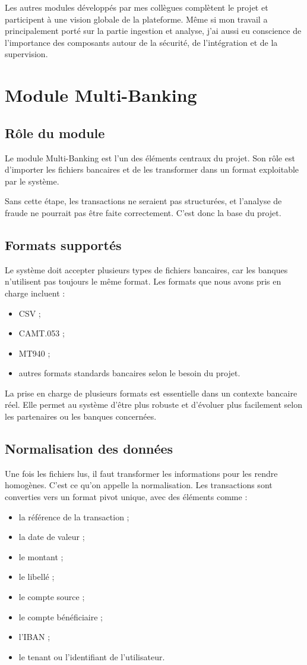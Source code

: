 ﻿\documentclass[12pt,a4paper]{report}
\begin{document}
Les autres modules développés par mes collègues complètent le projet et participent à une vision globale de la plateforme. Même si mon travail a principalement porté sur la partie ingestion et analyse, j'ai aussi eu conscience de l'importance des composants autour de la sécurité, de l'intégration et de la supervision.

\chapter{Module Multi-Banking}
\section{Rôle du module}
Le module Multi-Banking est l'un des éléments centraux du projet. Son rôle est d'importer les fichiers bancaires et de les transformer dans un format exploitable par le système.

Sans cette étape, les transactions ne seraient pas structurées, et l'analyse de fraude ne pourrait pas être faite correctement. C'est donc la base du projet.

\section{Formats supportés}
Le système doit accepter plusieurs types de fichiers bancaires, car les banques n'utilisent pas toujours le même format. Les formats que nous avons pris en charge incluent :
\begin{itemize}[leftmargin=1.5em]
    \item CSV ;
    \item CAMT.053 ;
    \item MT940 ;
    \item autres formats standards bancaires selon le besoin du projet.
\end{itemize}

La prise en charge de plusieurs formats est essentielle dans un contexte bancaire réel. Elle permet au système d'être plus robuste et d'évoluer plus facilement selon les partenaires ou les banques concernées.

\section{Normalisation des données}
Une fois les fichiers lus, il faut transformer les informations pour les rendre homogènes. C'est ce qu'on appelle la normalisation. Les transactions sont converties vers un format pivot unique, avec des éléments comme :
\begin{itemize}[leftmargin=1.5em]
    \item la référence de la transaction ;
    \item la date de valeur ;
    \item le montant ;
    \item le libellé ;
    \item le compte source ;
    \item le compte bénéficiaire ;
    \item l'IBAN ;
    \item le tenant ou l'identifiant de l'utilisateur.
\end{itemize}
\end{document}
